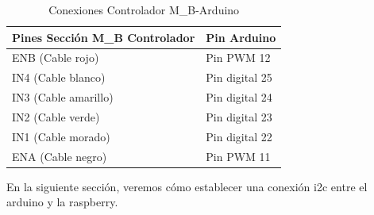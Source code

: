 \documentclass[12pt, letterpaper]{article}
\begin{document}
\begin{table}[h]
    \centering
    \begin{tabular}{|l|l|}
        \hline
        \textbf{Pines Sección M\_B Controlador} & \textbf{Pin Arduino} \\ \hline
        ENB (Cable rojo)               & Pin PWM 12          \\ 
        IN4 (Cable blanco)             & Pin digital 25      \\ 
        IN3 (Cable amarillo)           & Pin digital 24      \\ 
        IN2 (Cable verde)              & Pin digital 23      \\ 
        IN1 (Cable morado)             & Pin digital 22      \\ 
        ENA (Cable negro)              & Pin PWM 11          \\ \hline
    \end{tabular}
    \caption{Conexiones Controlador M\_B-Arduino}
    \label{tab:conexiones-mb}
\end{table}

En la siguiente sección, veremos cómo establecer una conexión i2c entre el arduino y la raspberry.










\end{document}
